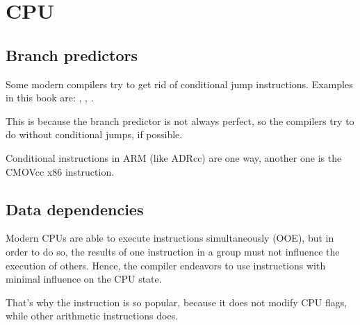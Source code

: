 ﻿\section{CPU}

\subsection{Branch predictors}
\label{branch_predictors}

Some modern compilers try to get rid of conditional jump instructions.
Examples in this book are: , , .

This is because the branch predictor is not always perfect, so the compilers try to do 
without conditional jumps, if possible.

Conditional instructions in ARM (like ADRcc) are one way, another one is the CMOVcc x86 instruction.

\subsection{Data dependencies}

Modern CPUs are able to execute instructions simultaneously (\ac{OOE}), but in order to do so,
the results of one instruction in a group must not influence the execution of others.
Hence, the compiler endeavors to use instructions with minimal influence on the CPU state.

That's why the \LEA instruction is so popular, because it does not modify CPU flags, while
other arithmetic instructions does.
